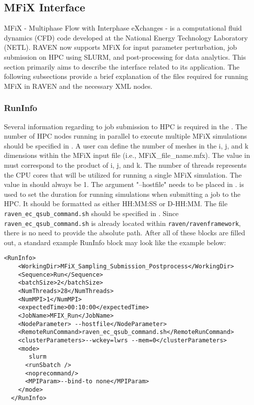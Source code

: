 \subsection{MFiX Interface}
MFiX - Multiphase Flow with Interphase eXchanges - is a computational fluid dynamics (CFD) code developed at the National Energy Technology Laboratory (NETL).
RAVEN now supports MFiX for input parameter perturbation, job submission on HPC using SLURM, and post-processing for data analytics.
This section primarily aims to describe the interface related to its application. The following subsections provide a brief explanation of the files required for running MFiX in RAVEN and the necessary XML nodes.

\subsubsection{RunInfo}
Several information regarding to job submission to HPC is required in the .
The number of HPC nodes running in parallel to execute multiple MFiX simulations should be specified in .
A user can define the number of meshes in the i, j, and k dimensions within the MFiX input file (i.e., MFiX_file_name.mfx).
The value in  must correspond to the product of i, j, and k. The number of threads represents the CPU cores that will be utilized for running a single MFiX simulation.
The value in  should always be 1.
The argument "--hostfile" needs to be placed in .
 is used to set the duration for running simulations when submitting a job to the HPC. It should be formatted as either HH:MM:SS or D-HH:MM.
The file \texttt{raven_ec_qsub_command.sh} should be specified in . Since \texttt{raven_ec_qsub_command.sh} is already located within \texttt{raven/ravenframework}, there is no need to provide the absolute path.
After all of these blocks are filled out, a standard example RunInfo block may look like the example below:
\begin{lstlisting}[style=XML]
  <RunInfo>
    <WorkingDir>MFiX_Sampling_Submission_Postprocess</WorkingDir>
    <Sequence>Run</Sequence>
    <batchSize>2</batchSize>
    <NumThreads>28</NumThreads>
    <NumMPI>1</NumMPI>
    <expectedTime>00:10:00</expectedTime>
    <JobName>MFIX_Run</JobName>
    <NodeParameter> --hostfile</NodeParameter>
    <RemoteRunCommand>raven_ec_qsub_command.sh</RemoteRunCommand>
    <clusterParameters>--wckey=lwrs --mem=0</clusterParameters>
    <mode>
       slurm
      <runSbatch />
      <noprecommand/>
      <MPIParam>--bind-to none</MPIParam>
    </mode>
  </RunInfo>
\end{lstlisting}

